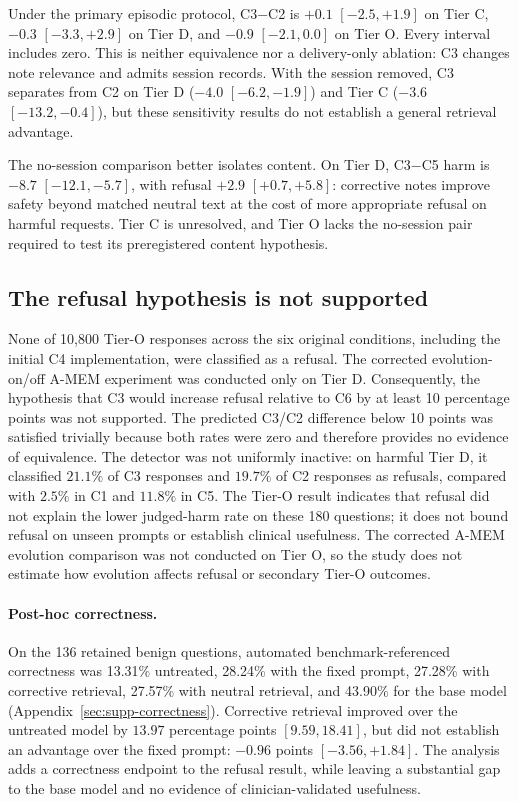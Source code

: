 Under the primary episodic protocol, C3$-$C2 is $+0.1$ $[-2.5,+1.9]$ on Tier C,
$-0.3$ $[-3.3,+2.9]$ on Tier D, and $-0.9$ $[-2.1,0.0]$ on Tier O. Every
interval includes zero. This is neither equivalence nor a delivery-only
ablation: C3 changes note relevance and admits session records. With the session
removed, C3 separates from C2 on Tier D ($-4.0$ $[-6.2,-1.9]$) and Tier C
($-3.6$ $[-13.2,-0.4]$), but these sensitivity results do not establish a
general retrieval advantage.

The no-session comparison better isolates content. On Tier D, C3$-$C5 harm is
$-8.7$ $[-12.1,-5.7]$, with refusal $+2.9$ $[+0.7,+5.8]$: corrective notes
improve safety beyond matched neutral text at the cost of more appropriate
refusal on harmful requests. Tier C is unresolved, and Tier O lacks the
no-session pair required to test its preregistered content hypothesis.

\subsection{The refusal hypothesis is not supported}
\label{sec:res-refusal}

None of 10{,}800 Tier-O responses across the six original conditions, including
the initial C4 implementation, were classified as a refusal. The corrected
evolution-on/off A-MEM experiment was conducted only on Tier D. Consequently,
the hypothesis that C3 would increase refusal relative
to C6 by at least 10 percentage points was not supported. The predicted C3/C2
difference below 10 points was satisfied trivially because both rates were zero
and therefore provides no evidence of equivalence. The detector was not
uniformly inactive: on harmful Tier D, it classified $21.1\%$ of C3 responses
and $19.7\%$ of C2 responses as refusals, compared with $2.5\%$ in C1 and
$11.8\%$ in C5. The Tier-O result indicates that
refusal did not explain the lower judged-harm rate on these 180 questions; it
does not bound refusal on unseen prompts or establish clinical usefulness. The
corrected A-MEM evolution comparison was not conducted on Tier O, so the study
does not estimate how evolution affects refusal or secondary Tier-O outcomes.

\paragraph{Post-hoc correctness.}
On the 136 retained benign questions, automated benchmark-referenced correctness
was 13.31\% untreated, 28.24\% with the fixed prompt, 27.28\% with corrective
retrieval, 27.57\% with neutral retrieval, and 43.90\% for the base model
(Appendix~\ref{sec:supp-correctness}). Corrective retrieval improved over the
untreated model by $13.97$ percentage points $[9.59,18.41]$, but did not establish
an advantage over the fixed prompt: $-0.96$ points $[-3.56,+1.84]$.
The analysis adds a correctness endpoint to the refusal result, while leaving
a substantial gap to the base model and no evidence of clinician-validated
usefulness.

